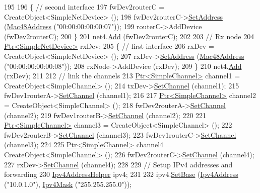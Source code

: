 \begin{DoxyCode}
195 
196   \{ \textcolor{comment}{// second interface}
197     fwDev2routerC = CreateObject<SimpleNetDevice> ();
198     fwDev2routerC->\hyperlink{classns3_1_1SimpleNetDevice_a968ef3e7318bac29d5f1d7d977029af4}{SetAddress} (\hyperlink{classns3_1_1Mac48Address}{Mac48Address} (\textcolor{stringliteral}{"00:00:00:00:00:07"}));
199     routerC->AddDevice (fwDev2routerC);
200   \}
201   net4.\hyperlink{classns3_1_1NetDeviceContainer_a7ca8bc1d7ec00fd4fcc63869987fbda5}{Add} (fwDev2routerC);
202 
203   \textcolor{comment}{// Rx node}
204   \hyperlink{classns3_1_1Ptr}{Ptr<SimpleNetDevice>} rxDev;
205   \{ \textcolor{comment}{// first interface}
206     rxDev = CreateObject<SimpleNetDevice> ();
207     rxDev->\hyperlink{classns3_1_1SimpleNetDevice_a968ef3e7318bac29d5f1d7d977029af4}{SetAddress} (\hyperlink{classns3_1_1Mac48Address}{Mac48Address} (\textcolor{stringliteral}{"00:00:00:00:00:08"}));
208     rxNode->AddDevice (rxDev);
209   \}
210   net4.\hyperlink{classns3_1_1NetDeviceContainer_a7ca8bc1d7ec00fd4fcc63869987fbda5}{Add} (rxDev);
211 
212   \textcolor{comment}{// link the channels}
213   \hyperlink{classns3_1_1Ptr}{Ptr<SimpleChannel>} channel1 = CreateObject<SimpleChannel> ();
214   txDev->\hyperlink{classns3_1_1SimpleNetDevice_af9e9828ad584b5ba538f18f645f162e0}{SetChannel} (channel1);
215   fwDev1routerA->\hyperlink{classns3_1_1SimpleNetDevice_af9e9828ad584b5ba538f18f645f162e0}{SetChannel} (channel1);
216 
217   \hyperlink{classns3_1_1Ptr}{Ptr<SimpleChannel>} channel2 = CreateObject<SimpleChannel> ();
218   fwDev2routerA->\hyperlink{classns3_1_1SimpleNetDevice_af9e9828ad584b5ba538f18f645f162e0}{SetChannel} (channel2);
219   fwDev1routerB->\hyperlink{classns3_1_1SimpleNetDevice_af9e9828ad584b5ba538f18f645f162e0}{SetChannel} (channel2);
220 
221   \hyperlink{classns3_1_1Ptr}{Ptr<SimpleChannel>} channel3 = CreateObject<SimpleChannel> ();
222   fwDev2routerB->\hyperlink{classns3_1_1SimpleNetDevice_af9e9828ad584b5ba538f18f645f162e0}{SetChannel} (channel3);
223   fwDev1routerC->\hyperlink{classns3_1_1SimpleNetDevice_af9e9828ad584b5ba538f18f645f162e0}{SetChannel} (channel3);
224 
225   \hyperlink{classns3_1_1Ptr}{Ptr<SimpleChannel>} channel4 = CreateObject<SimpleChannel> ();
226   fwDev2routerC->\hyperlink{classns3_1_1SimpleNetDevice_af9e9828ad584b5ba538f18f645f162e0}{SetChannel} (channel4);
227   rxDev->\hyperlink{classns3_1_1SimpleNetDevice_af9e9828ad584b5ba538f18f645f162e0}{SetChannel} (channel4);
228 
229   \textcolor{comment}{// Setup IPv4 addresses and forwarding}
230   \hyperlink{classns3_1_1Ipv4AddressHelper}{Ipv4AddressHelper} ipv4;
231 
232   ipv4.\hyperlink{classns3_1_1Ipv4AddressHelper_acf7b16dd25bac67e00f5e25f90a9a035}{SetBase} (\hyperlink{classns3_1_1Ipv4Address}{Ipv4Address} (\textcolor{stringliteral}{"10.0.1.0"}), \hyperlink{classns3_1_1Ipv4Mask}{Ipv4Mask} (\textcolor{stringliteral}{"255.255.255.0"}));

\end{DoxyCode}
